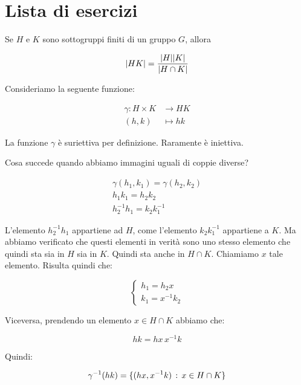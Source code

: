 \chapter{Lista di esercizi}

\begin{esercizio}
	\label{ex:ordine_HK}
	Se $H$ e $K$ sono sottogruppi finiti di un gruppo $G$, allora
	
	\begin{equation}
		\lvert HK \rvert = \dfrac{\lvert H \rvert\lvert K \rvert}{\lvert H \cap K \rvert}
	\end{equation}
\end{esercizio}
\begin{soluzione}
	Consideriamo la seguente funzione:
	
	\begin{align}
		\gamma : H \times K &\longrightarrow HK \\
		(h, k) &\longmapsto hk
	\end{align}

	La funzione $\gamma$ è suriettiva per definizione. Raramente è iniettiva.
	
	Cosa succede quando abbiamo immagini uguali di coppie diverse?
	
	\begin{gather}
		\gamma(h_1, k_1) = \gamma(h_2, k_2) \\
		h_1k_1 = h_2k_2 \\
		h_2^{-1}h_1 = k_2k_1^{-1}
	\end{gather}

	L'elemento $h_2^{-1}h_1$ appartiene ad $H$, come l'elemento $k_2k_1^{-1}$ appartiene a $K$. Ma abbiamo verificato che questi elementi in verità sono uno stesso elemento che quindi sta sia in $H$ sia in $K$. Quindi sta anche in $H \cap K$. Chiamiamo $x$ tale elemento. Risulta quindi che:
	
	\begin{equation}
		\begin{cases}
			h_1 = h_2x \\
			k_1 = x^{-1}k_2
		\end{cases}
	\end{equation}

	Viceversa, prendendo un elemento $x \in H \cap K$ abbiamo che:
	
	\begin{equation}
		hk = hx \, x^{-1}k
	\end{equation}

	Quindi:
	
	\begin{equation}
		\gamma^{-1}(hk) = \{(hx, x^{-1}k) \,:\, x \in H \cap K\}
	\end{equation}


\end{soluzione}
